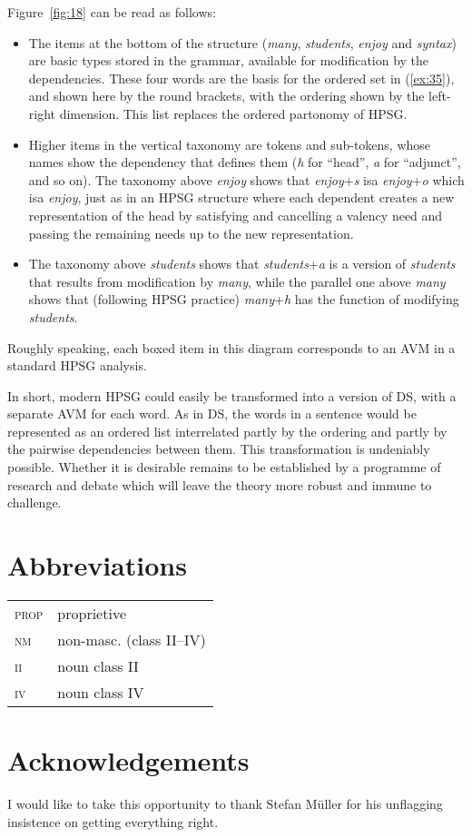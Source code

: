 \documentclass[output=paper
 	        ,biblatex
                ,babelshorthands
                ,newtxmath
                ,draftmode
                ,colorlinks, citecolor=brown
]{langscibook}
\begin{document}
Figure~\ref{fig:18} can be read as follows:

\begin{itemize}
	\item The items at the bottom of the structure (\emph{many}, \emph{students}, \emph{enjoy} and \emph{syntax}) are basic types stored in the grammar, available for modification by the dependencies. These four words are the basis for the ordered set in (\ref{ex:35}), and shown here by the round brackets, with the ordering shown by the left-right dimension. This list replaces the ordered partonomy of HPSG.

	\item Higher items in the vertical taxonomy are tokens and sub-tokens, whose names show the dependency that defines them (\emph{h} for ``head'', \emph{a} for ``adjunct'', and so on). The taxonomy above \emph{enjoy} shows that \emph{enjoy}+\emph{s} isa \emph{enjoy}+\emph{o} which isa \emph{enjoy}, just as in an HPSG structure where each dependent creates a new representation of the head by satisfying and cancelling a valency need and passing the remaining needs up to the new representation.

	\item The taxonomy above \emph{students} shows that \emph{students}+\emph{a} is a version of \emph{students} that results from modification by \emph{many}, while the parallel one above \emph{many} shows that (following HPSG practice) \emph{many}+\emph{h} has the function of modifying \emph{students}.
\end{itemize}

Roughly speaking, each boxed item in this diagram corresponds to an AVM in a standard HPSG analysis.

In short, modern HPSG could easily be transformed into a version of DS, with a separate AVM for each word. As in DS, the words in a sentence would be represented as an ordered list interrelated partly by the ordering and partly by the pairwise dependencies between them. This transformation is undeniably possible. Whether it is desirable remains to be established by a programme of research and debate which will leave the theory more robust and immune to challenge.


\section*{Abbreviations}



\begin{tabularx}{.99\textwidth}{@{}lX}
\textsc{prop} & proprietive\\
\textsc{nm}   & non-masc. (class II--IV)\\
\textsc{ii}   & noun class II\\
\textsc{iv}   & noun class IV\\
\end{tabularx}


\section*{Acknowledgements}

I would like to take this opportunity to thank Stefan Müller for his unflagging insistence on getting everything right. 

{\sloppy
\printbibliography[heading=subbibliography,notkeyword=this] 
}
\end{document}
